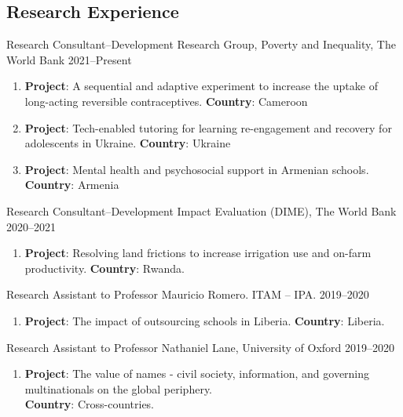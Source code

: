 \documentclass[a4paper,10pt]{article}
\renewenvironment{itemize}{
  \begin{list}{}
    { \setlength{\itemsep}{5pt}
      \setlength{\parsep}{0pt}
      \setlength{\topsep}{0pt}
      \setlength{\leftmargin}{0em} } }{
  \end{list}}
\begin{document}
\subsection*{Research Experience}

\begin{itemize}
  \item Research Consultant--Development Research Group, Poverty and Inequality, The World Bank \hfill 2021--Present 
  \begin{enumerate}[leftmargin=10pt, label={}, nosep]
    \item {\small \textbf{Project}: A sequential and adaptive experiment to increase the uptake of long-acting reversible contraceptives. \newline 
    \textbf{Country}: Cameroon} 
    \item {\small \textbf{Project}: Tech-enabled tutoring for learning re-engagement and recovery for adolescents in Ukraine. \newline 
    \textbf{Country}: Ukraine}
    \item {\small \textbf{Project}: Mental health and psychosocial support in Armenian schools. \newline 
    \textbf{Country}: Armenia}    
  \end{enumerate}
  \item Research Consultant--Development Impact Evaluation (DIME), The World Bank \hfill 2020--2021 
  \begin{enumerate}[leftmargin=10pt, label={}, nosep]  
    \item {\small \textbf{Project}: Resolving land frictions to increase irrigation use and on-farm productivity. \newline \textbf{Country}: Rwanda.}
  \end{enumerate}
  \item Research Assistant to Professor Mauricio Romero. ITAM -- IPA. \hfill 2019--2020  
  \begin{enumerate}[leftmargin=10pt, label={}, nosep]  
    \item {\small \textbf{Project}: The impact of outsourcing schools in Liberia. \newline \textbf{Country}: Liberia.}
  \end{enumerate}
  \item Research Assistant to Professor Nathaniel Lane, University of Oxford \hfill 2019--2020  
  \begin{enumerate}[leftmargin=10pt, label={}, nosep]  
    \item {\small \textbf{Project}: The value of names - civil society, information, and governing multinationals on the global periphery. \\ \textbf{Country}: Cross-countries.}

\end{enumerate}
\end{itemize}
\end{document}
